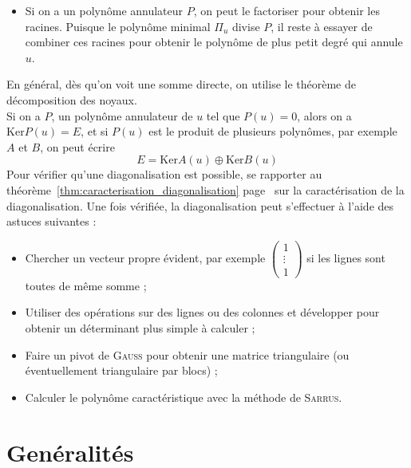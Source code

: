 \documentclass[11pt,a4paper,fleqn,pdftex]{report}
\begin{document}
\begin{methode}
\begin{itemize}
         \item Si on a un polynôme annulateur $P$, on peut le factoriser pour obtenir les racines. Puisque le polynôme minimal $\Pi_u$ divise $P$, il reste à essayer de combiner ces racines pour obtenir le polynôme de plus petit degré qui annule $u$. 
     \end{itemize}
     En général, dès qu'on voit une somme directe, on utilise le théorème de décomposition des noyaux. \\
     Si on a $P$, un polynôme annulateur de $u$ tel que $P(u) = 0$, alors on a $\mathrm{Ker}P(u) = E$, et si $P(u)$ est le produit de plusieurs polynômes, par exemple $A$ et $B$, on peut écrire 
     \[
         E = \mathrm{Ker} A(u) \oplus \mathrm{Ker} B(u)
     \]
Pour vérifier qu'une diagonalisation est possible, se rapporter au théorème~\ref{thm:caracterisation_diagonalisation} page~\pageref{thm:caracterisation_diagonalisation} sur la caractérisation de la diagonalisation. Une fois vérifiée, la diagonalisation peut s'effectuer à l'aide des astuces suivantes : 
\begin{itemize}
    \item Chercher un vecteur propre évident, par exemple $\begin{pmatrix} 1\\ \vdots \\ 1 \end{pmatrix}$ si les lignes sont toutes de même somme ;
    \item Utiliser des opérations sur des lignes ou des colonnes et développer pour obtenir un déterminant plus simple à calculer ;
    \item Faire un pivot de \textsc{Gauss} pour obtenir une matrice triangulaire (ou éventuellement triangulaire par blocs) ;
    \item Calculer le polynôme caractéristique avec la méthode de \textsc{Sarrus}.
\end{itemize}
\end{methode}
\section{Genéralités}
%
\end{document}

